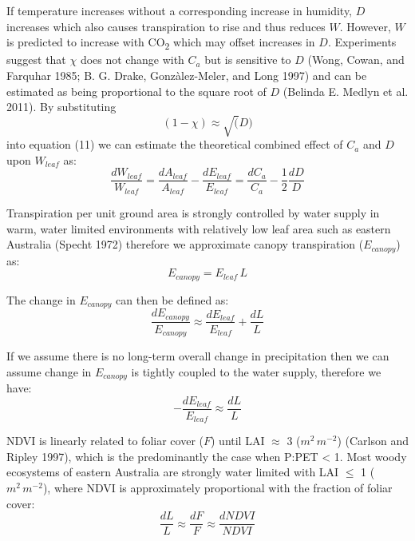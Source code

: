 \documentclass[
]{article}
\begin{document}
If temperature increases without a corresponding increase in humidity,
\(D\) increases which also causes transpiration to rise and thus reduces
\(W\). However, \(W\) is predicted to increase with CO\textsubscript{2}
which may offset increases in \(D\). Experiments suggest that \(\chi\)
does not change with \(C_a\) but is sensitive to \(D\) (Wong, Cowan, and
Farquhar 1985; B. G. Drake, Gonzàlez-Meler, and Long 1997) and can be
estimated as being proportional to the square root of \(D\) (Belinda E.
Medlyn et al. 2011). By substituting \[(1-\chi) \approx \sqrt(D)\] into
equation (11) we can estimate the theoretical combined effect of \(C_a\)
and \(D\) upon \(W_{leaf}\) as: \begin{equation}
\frac{dW_{leaf}}{W_{leaf}}=\frac{dA_{leaf}}{A_{leaf}} - \frac{dE_{leaf}}{E_{leaf}} = \frac{dC_a}{C_a} - \frac{1}{2}\frac{dD}{D}
\end{equation}

Transpiration per unit ground area is strongly controlled by water
supply in warm, water limited environments with relatively low leaf area
such as eastern Australia (Specht 1972) therefore we approximate canopy
transpiration (\(E_{canopy}\)) as: \begin{equation}
E_{canopy}=E_{leaf}\,L
\end{equation}

The change in \(E_{canopy}\) can then be defined as: \begin{equation}
\frac{dE_{canopy}}{E_{canopy}} \approx \frac{dE_{leaf}}{E_{leaf}}+\frac{dL}{L}
\end{equation}

If we assume there is no long-term overall change in precipitation then
we can assume change in \(E_{canopy}\) is tightly coupled to the water
supply, therefore we have: \begin{equation}
-\frac{dE_{leaf}}{E_{leaf}} \approx \frac{dL}{L}
\end{equation}

NDVI is linearly related to foliar cover (\(F\)) until LAI \(\approx\) 3
(\(m^2\,m^{-2}\)) (Carlson and Ripley 1997), which is the predominantly
the case when P:PET \textless{} 1. Most woody ecosystems of eastern
Australia are strongly water limited with LAI \(\leq\) 1
(\(m^2\,m^{-2}\)), where NDVI is approximately proportional with the
fraction of foliar cover: \begin{equation}
\frac{dL}{L}\approx\frac{dF}{F}\approx\frac{d NDVI}{NDVI}
\end{equation}
\end{document}
